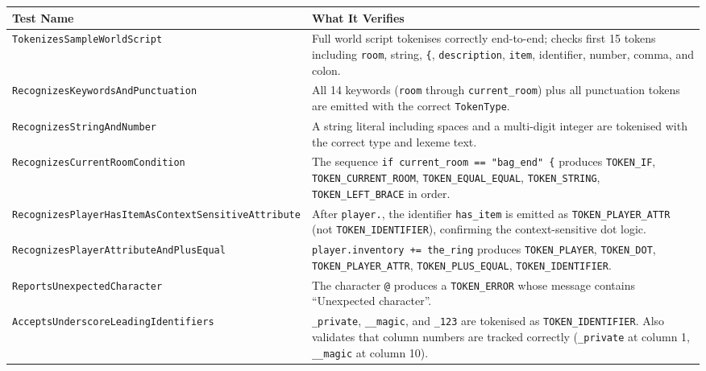 \documentclass[12pt, a4paper]{article}
\begin{document}
\begin{longtable}{p{6.5cm} p{7cm}}
\toprule
\textbf{Test Name} & \textbf{What It Verifies} \\
\midrule
\endhead
\texttt{TokenizesSampleWorldScript} &
  Full world script tokenises correctly end-to-end; checks first 15 tokens including
  \texttt{room}, string, \texttt{\{}, \texttt{description}, \texttt{item}, identifier,
  number, comma, and colon. \\[4pt]

\texttt{RecognizesKeywordsAndPunctuation} &
  All 14 keywords (\texttt{room} through \texttt{current\_room}) plus all punctuation
  tokens are emitted with the correct \texttt{TokenType}. \\[4pt]

\texttt{RecognizesStringAndNumber} &
  A string literal including spaces and a multi-digit integer are tokenised with the
  correct type and lexeme text. \\[4pt]

\texttt{RecognizesCurrentRoomCondition} &
  The sequence \texttt{if current\_room == "bag\_end" \{} produces
  \texttt{TOKEN\_IF}, \texttt{TOKEN\_CURRENT\_ROOM}, \texttt{TOKEN\_EQUAL\_EQUAL},
  \texttt{TOKEN\_STRING}, \texttt{TOKEN\_LEFT\_BRACE} in order. \\[4pt]

\texttt{RecognizesPlayerHasItemAsContextSensitiveAttribute} &
  After \texttt{player.}, the identifier \texttt{has\_item} is emitted as
  \texttt{TOKEN\_PLAYER\_ATTR} (not \texttt{TOKEN\_IDENTIFIER}), confirming the
  context-sensitive dot logic. \\[4pt]

\texttt{RecognizesPlayerAttributeAndPlusEqual} &
  \texttt{player.inventory += the\_ring} produces
  \texttt{TOKEN\_PLAYER}, \texttt{TOKEN\_DOT}, \texttt{TOKEN\_PLAYER\_ATTR},
  \texttt{TOKEN\_PLUS\_EQUAL}, \texttt{TOKEN\_IDENTIFIER}. \\[4pt]

\texttt{ReportsUnexpectedCharacter} &
  The character \texttt{@} produces a \texttt{TOKEN\_ERROR} whose message contains
  ``Unexpected character''. \\[4pt]

\texttt{AcceptsUnderscoreLeadingIdentifiers} &
  \texttt{\_private}, \texttt{\_\_magic}, and \texttt{\_123} are tokenised as
  \texttt{TOKEN\_IDENTIFIER}.
  Also validates that column numbers are tracked correctly
  (\texttt{\_private} at column 1, \texttt{\_\_magic} at column 10). \\[4pt]


\end{longtable}
\end{document}

